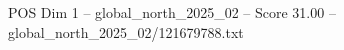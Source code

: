 \begin{textsample}{POS Dim 1 – global\_north\_2025\_02 – Score 31.00 – global\_north\_2025\_02/121679788.txt}
\end{textsample}
